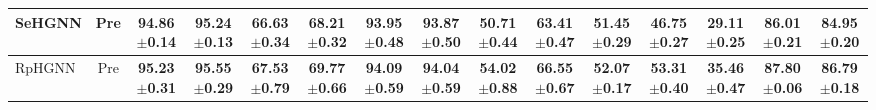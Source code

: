 \documentclass[lettersize,journal]{IEEEtran}
\begin{document}
\begin{table*}[!tp]
{\begin{tabular}{l c c c c c c c c c c c c c c}
SeHGNN 
               & Pre     &  94.86$\pm$0.14 & 95.24$\pm$0.13 & 66.63$\pm$0.34 & 68.21$\pm$0.32 & 93.95$\pm$0.48 & 93.87$\pm$0.50 & 50.71$\pm$0.44 & 63.41$\pm$0.47 & 51.45$\pm$0.29 & 46.75$\pm$0.27 
                                                                                                                                                                                    & 29.11$\pm$0.25 
                                                                                                                                                                                        & 86.01$\pm$0.21 
                                                                                                                                                                                            & 84.95$\pm$0.20\\\hline
RpHGNN 
                & Pre     & \textbf{95.23$\pm$0.31} 
                                           & \textbf{95.55$\pm$0.29}
                                                            & \textbf{67.53$\pm$0.79}     
                                                                             & \textbf{69.77$\pm$0.66}   
                                                                                              &  \textbf{94.09$\pm$0.59} 
                                                                                                               & \textbf{94.04$\pm$0.59} 
                                                                                                                                & \textbf{54.02$\pm$0.88}    
                                                                                                                                                & \textbf{66.55$\pm$0.67} 
                                                                                                                                                            & \textbf{52.07$\pm$0.17} 
                                                                                                                                                                    & \textbf{53.31$\pm$0.40} 
                                                                                                                                                                                            & \textbf{35.46$\pm$0.47}
                                                                                                                  & \textbf{87.80$\pm$0.06}
                                                                                                                        & \textbf{86.79$\pm$0.18}\\\hline

\end{tabular}
}
\label{tab:performance}

\end{table*}
\end{document}
